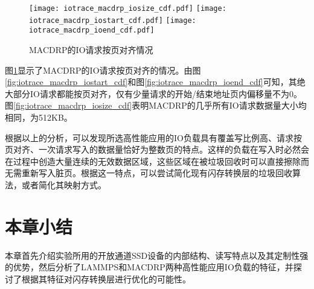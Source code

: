 \begin{figure}[H]
  \centering
    {\texttt{[image: iotrace\_macdrp\_iosize\_cdf.pdf]}}
  \hspace{1em}
      {\texttt{[image: iotrace\_macdrp\_iostart\_cdf.pdf]}}
      \hspace{1em}
          {\texttt{[image: iotrace\_macdrp\_ioend\_cdf.pdf]}}
  \caption{MACDRP的IO请求按页对齐情况}
  \label{fig:iotrace_macdrp_iocdf}
\end{figure}

图\ref{fig:iotrace_macdrp_iocdf}显示了MACDRP的IO请求按页对齐的情况。由图\ref{fig:iotrace_macdrp_iostart_cdf}和图\ref{fig:iotrace_macdrp_ioend_cdf}可知，其绝大部分IO请求都能按页对齐，仅有少量请求的开始/结束地址页内偏移量不为0。图\ref{fig:iotrace_macdrp_iosize_cdf}表明MACDRP的几乎所有IO请求数据量大小均相同，为512KB。

根据以上的分析，可以发现所选高性能应用的IO负载具有覆盖写比例高、请求按页对齐、一次请求写入的数据量恰好为整数页的特点。这样的负载在写入时必然会在过程中创造大量连续的无效数据区域，这些区域在被垃圾回收时可以直接擦除而无需重新写入脏页。根据这一特点，可以尝试简化现有闪存转换层的垃圾回收算法，或者简化其映射方式。

\section{本章小结}
本章首先介绍实验所用的开放通道SSD设备的内部结构、读写特点以及其定制性强的优势，然后分析了LAMMPS和MACDRP两种高性能应用IO负载的特征，并探讨了根据其特征对闪存转换层进行优化的可能性。